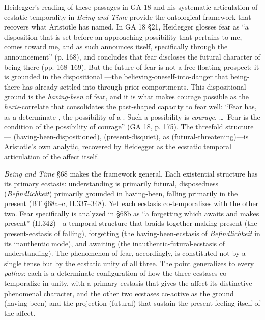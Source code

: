 Heidegger's reading of these passages in GA 18 and his systematic articulation of ecstatic temporality in \textit{Being and Time} provide the ontological framework that recovers what Aristotle has named. In GA 18 \S21, Heidegger glosses fear as ``a disposition that is set before an approaching possibility that pertains to me, comes toward me, and as such announces itself, specifically through the announcement'' (p. 168), and concludes that fear discloses the futural character of being-there (pp. 168--169). But the future of fear is not a free-floating prospect; it is grounded in the dispositional ---the believing-oneself-into-danger that being-there has already settled into through prior comportments. This dispositional ground is the \textit{having-been} of fear, and it is what makes courage possible as the \textit{hexis}-correlate that consolidates the past-shaped capacity to fear well: ``Fear has, as a determinate , the possibility of a . Such a possibility is \textit{courage}. \ldots\ Fear is the condition of the possibility of courage'' (GA 18, p. 175). The threefold structure--- (having-been-dispositioned),  (present-disquiet),  as  (futural-threatening)---is Aristotle's own analytic, recovered by Heidegger as the ecstatic temporal articulation of the affect itself.

\textit{Being and Time} \S68 makes the framework general. Each existential structure has its primary ecstasis: understanding is primarily futural, disposedness (\textit{Befindlichkeit}) primarily grounded in having-been, falling primarily in the present (BT \S68a--c, H.337--348). Yet each ecstasis co-temporalizes with the other two. Fear specifically is analyzed in \S68b as ``a forgetting which awaits and makes present'' (H.342)---a temporal structure that braids together making-present (the present-ecstasis of falling), forgetting (the having-been-ecstasis of \textit{Befindlichkeit} in its inauthentic mode), and awaiting (the inauthentic-futural-ecstasis of understanding). The phenomenon of fear, accordingly, is constituted not by a single tense but by the ecstatic unity of all three. The point generalizes to every \textit{pathos}: each is a determinate configuration of how the three ecstases co-temporalize in unity, with a primary ecstasis that gives the affect its distinctive phenomenal character, and the other two ecstases co-active as the ground (having-been) and the projection (futural) that sustain the present feeling-itself of the affect.

